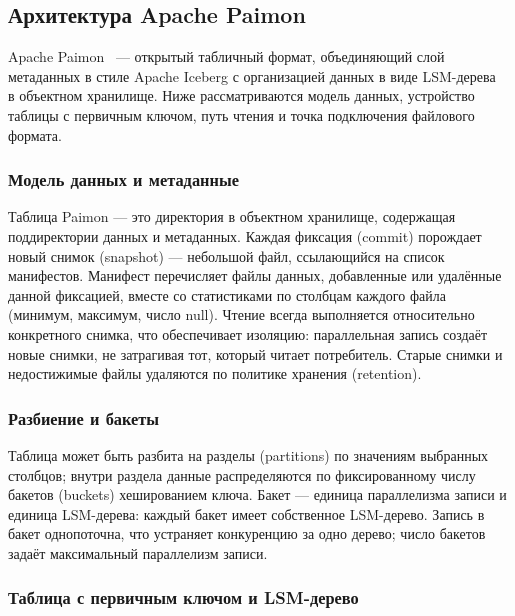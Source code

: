 \subsection{Архитектура Apache Paimon}

Apache Paimon~\cite{paimon-docs} --- открытый табличный формат, объединяющий слой
метаданных в стиле Apache Iceberg с организацией данных в виде LSM-дерева~\cite{luo2020lsm}
в объектном хранилище. Ниже рассматриваются модель данных, устройство таблицы с
первичным ключом, путь чтения и точка подключения файлового формата.

\subsubsection{Модель данных и метаданные}

Таблица Paimon --- это директория в объектном хранилище, содержащая поддиректории
данных и метаданных. Каждая фиксация (commit) порождает новый снимок (snapshot)
--- небольшой файл, ссылающийся на список манифестов. Манифест перечисляет файлы
данных, добавленные или удалённые данной фиксацией, вместе со статистиками по
столбцам каждого файла (минимум, максимум, число null). Чтение всегда выполняется
относительно конкретного снимка, что обеспечивает изоляцию: параллельная запись
создаёт новые снимки, не затрагивая тот, который читает потребитель. Старые снимки
и недостижимые файлы удаляются по политике хранения (retention).

\subsubsection{Разбиение и бакеты}

Таблица может быть разбита на разделы (partitions) по значениям выбранных столбцов;
внутри раздела данные распределяются по фиксированному числу бакетов (buckets)
хешированием ключа. Бакет --- единица параллелизма записи и единица LSM-дерева:
каждый бакет имеет собственное LSM-дерево. Запись в бакет однопоточна, что устраняет
конкуренцию за одно дерево; число бакетов задаёт максимальный параллелизм записи.

\subsubsection{Таблица с первичным ключом и LSM-дерево}

